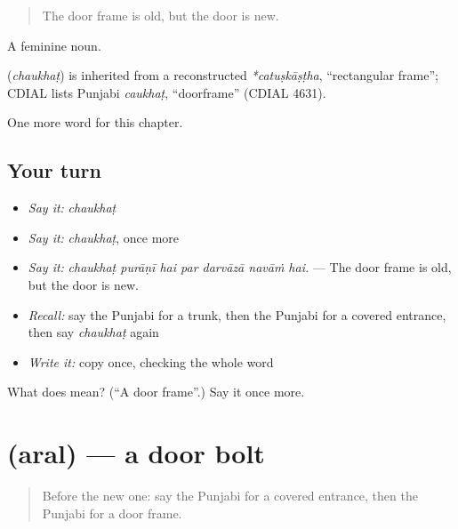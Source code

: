 \begin{quote}
The door frame is old, but the door is new.
\end{quote}

A feminine noun.

\begin{cousinweb}
\textbf{} (\emph{chaukhaṭ}) is inherited from a reconstructed \emph{*catuṣkāṣṭha}, \textquotedblleft{}rectangular frame\textquotedblright{}; CDIAL lists Punjabi \emph{caukhaṭ}, \textquotedblleft{}doorframe\textquotedblright{} (CDIAL 4631).
\end{cousinweb}

\begin{grammarlens}[title={What you've built}]
One more word for this chapter.
\end{grammarlens}

\subsection*{Your turn}
\begin{itemize}
\raggedright
  \item \emph{Say it:} \emph{chaukhaṭ}
  \item \emph{Say it:} \emph{chaukhaṭ}, once more
  \item \emph{Say it:} \emph{chaukhaṭ purāṇī hai par darvāzā navāṁ hai.} — The door frame is old, but the door is new.
  \item \emph{Recall:} say the Punjabi for a trunk, then the Punjabi for a covered entrance, then say \emph{chaukhaṭ} again
  \item \emph{Write it:} copy \textbf{} once, checking the whole word
\end{itemize}

\begin{tcolorbox}[breakable,colback=teal!4,colframe=teal!35!black,title={Before you move on}]
What does  mean? (\textquotedblleft{}A door frame\textquotedblright{}.) Say it once more.
\end{tcolorbox}
\section[\texorpdfstring{\pa{ਅਰਲ} (aral)}{ਅਰਲ (aral)}]{ (aral) — a door bolt}

\label{lesson:PA-C248-aral}



\begin{quote}
Before the new one: say the Punjabi for a covered entrance, then the Punjabi for a door frame.
\end{quote}

